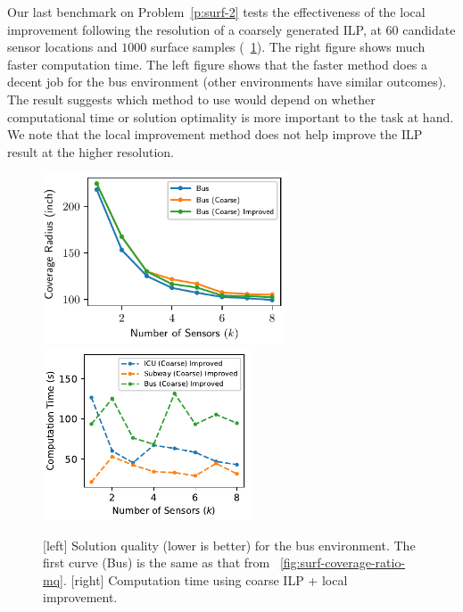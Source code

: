 Our last benchmark on Problem~\ref{p:surf-2} tests the effectiveness of the local improvement following the resolution of a coarsely generated ILP, at $60$ candidate sensor locations and $1000$ surface samples (~\ref{fig:surf-coverage-ratio-cu}). The right figure shows much faster computation time. The left figure shows that the  faster method does a decent job for the bus environment (other environments have similar outcomes). The result suggests which method to use would depend on whether computational time or solution optimality is more important to the task at hand. We note that the local improvement method does not help improve the ILP result at the higher resolution. 

\begin{figure}[!ht]
    \centering
    \includegraphics[width=.46\columnwidth, height=2in]{chapters/surf/fig/result-bus-mq-eps-converted-to.pdf}
    \includegraphics[width=.46\columnwidth, height=2in]{chapters/surf/fig/result-time-mq-coarse-eps-converted-to.pdf}    
    \caption{ [left] Solution quality (lower is better) for the bus environment. 
    The first curve (Bus) is the same as that from ~\ref{fig:surf-coverage-ratio-mq}. 
    [right] Computation time using coarse ILP + local improvement.}
\label{fig:surf-coverage-ratio-cu}
\end{figure}

